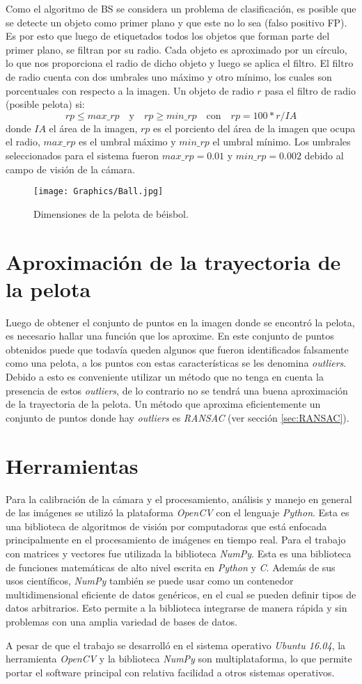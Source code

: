 Como el algoritmo de BS se considera un problema de clasificación, es posible que se detecte un objeto como primer plano y que este no lo sea (falso positivo FP). Es por esto que luego de etiquetados todos los objetos que forman parte del primer plano, se filtran por su radio. Cada objeto es aproximado por un círculo, lo que nos proporciona el radio de dicho objeto y luego se aplica el filtro. El filtro de radio cuenta con dos umbrales uno máximo y otro mínimo, los cuales son porcentuales con respecto a la imagen. Un objeto de radio $r$ pasa el filtro de radio (posible pelota) si:
$$rp \leq max\_rp \quad \text{y} \quad rp \geq min\_rp \quad \text{con} \quad rp = 100*r/IA$$
donde $IA$ el área de la imagen, $rp$ es el porciento del área de la imagen que ocupa el radio, $max\_rp$ es el umbral máximo y $min\_rp$ el umbral mínimo. Los umbrales seleccionados para el sistema fueron $max\_rp = 0.01$ y $min\_rp = 0.002$ debido al campo de visión de la cámara. 

\begin{figure}[!h]
    \centering
    \texttt{[image: Graphics/Ball.jpg]}
    \caption{Dimensiones de la pelota de béisbol.}
    \label{fig:BallDimentions}
\end{figure}

\section{Aproximación de la trayectoria de la pelota}

Luego de obtener el conjunto de puntos en la imagen donde se encontró la pelota, es necesario hallar una función que los aproxime. En este conjunto de puntos obtenidos puede que todavía queden algunos que fueron identificados falsamente como una pelota, a los puntos con estas características se les denomina \textit{outliers}. Debido a esto es conveniente utilizar un método que no tenga en cuenta la presencia de estos \textit{outliers}, de lo contrario no se tendrá una buena aproximación de la trayectoria de la pelota. Un método que aproxima eficientemente un conjunto de puntos donde hay \textit{outliers} es \textit{RANSAC} (ver sección \ref{sec:RANSAC}).

\section{Herramientas}

Para la calibración de la cámara y el procesamiento, análisis y manejo en general de las imágenes se utilizó la plataforma \textit{OpenCV} con el lenguaje \textit{Python}. Esta es una biblioteca de algoritmos de visión por computadoras que está enfocada principalmente en el procesamiento de imágenes en tiempo real. Para el trabajo con matrices y vectores fue utilizada la biblioteca \textit{NumPy}. Esta es una biblioteca de funciones matemáticas de alto nivel escrita en \textit{Python} y \textit{C}. Además de sus usos científicos, \textit{NumPy} también se puede usar como un contenedor multidimensional eficiente de datos genéricos, en el cual se pueden definir tipos de datos arbitrarios. Esto permite a la biblioteca integrarse de manera rápida y sin problemas con una amplia variedad de bases de datos.

A pesar de que el trabajo se desarrolló en el sistema operativo \textit{Ubuntu 16.04}, la herramienta \textit{OpenCV} y la biblioteca \textit{NumPy} son multiplataforma, lo que permite portar el software principal con relativa facilidad a otros sistemas operativos.
